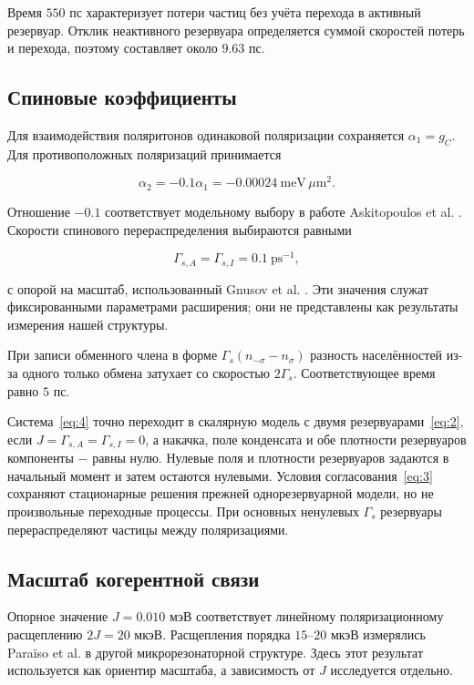 \documentclass[12pt,a4paper]{article}
\begin{document}
Время \(550\) пс характеризует потери частиц без учёта перехода в активный резервуар. Отклик неактивного резервуара определяется суммой скоростей потерь и перехода, поэтому составляет около \(9.63\) пс.

\subsection{Спиновые коэффициенты}\label{sec:A.3}

Для взаимодействия поляритонов одинаковой поляризации сохраняется \(\alpha_1=g_C\). Для противоположных поляризаций принимается

\[
\alpha_2=-0.1\alpha_1
=-0.00024\ \mathrm{meV}\,\mu\mathrm m^2.
\]

Отношение \(-0.1\) соответствует модельному выбору в работе Askitopoulos et al. \cite{ref4}. Скорости спинового перераспределения выбираются равными

\[
\Gamma_{s,A}=\Gamma_{s,I}=0.1\ \mathrm{ps}^{-1},
\]

с опорой на масштаб, использованный Gnusov et al. \cite{ref3}. Эти значения служат фиксированными параметрами расширения; они не представлены как результаты измерения нашей структуры.

При записи обменного члена в форме \(\Gamma_s(n_{-\sigma}-n_\sigma)\) разность населённостей из-за одного только обмена затухает со скоростью \(2\Gamma_s\). Соответствующее время равно \(5\) пс.

Система~\eqref{eq:4} точно переходит в скалярную модель с двумя резервуарами~\eqref{eq:2}, если \(J=\Gamma_{s,A}=\Gamma_{s,I}=0\), а накачка, поле конденсата и обе плотности резервуаров компоненты \(-\) равны нулю. Нулевые поля и плотности резервуаров задаются в начальный момент и затем остаются нулевыми. Условия согласования~\eqref{eq:3} сохраняют стационарные решения прежней однорезервуарной модели, но не произвольные переходные процессы. При основных ненулевых \(\Gamma_s\) резервуары перераспределяют частицы между поляризациями.

\subsection{Масштаб когерентной связи}\label{sec:A.4}

Опорное значение \(J=0.010\) мэВ соответствует линейному поляризационному расщеплению \(2J=20\) мкэВ. Расщепления порядка \(15\)–\(20\) мкэВ измерялись Paraïso et al. \cite{ref5} в другой микрорезонаторной структуре. Здесь этот результат используется как ориентир масштаба, а зависимость от \(J\) исследуется отдельно.
\end{document}
